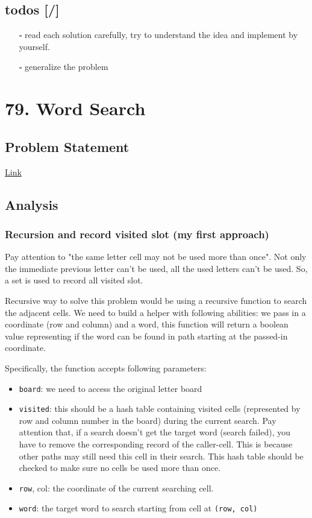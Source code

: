 \documentclass[12pt]{article}
\begin{document}
\subsection{todos [/]}
\label{sec:org1f2cc5f}
\begin{itemize}
\item[{$\square$}] read each solution carefully, try to understand the idea and implement by yourself.
\item[{$\square$}] generalize the problem
\end{itemize}

\section{79. Word Search}
\label{sec:org059f71b}
\subsection{Problem Statement}
\label{sec:org671f98a}
\href{https://leetcode.com/problems/word-search/}{Link}
\subsection{Analysis}
\label{sec:org80840ec}
\subsubsection{Recursion and record visited slot (my first approach)}
\label{sec:orgad44304}
Pay attention to "the same letter cell may not be used more than once". Not only the immediate previous letter can't be used, all the used letters can't be used. So, a set is used to record all visited slot.

Recursive way to solve this problem would be using a recursive function to search the adjacent cells. We need to build a helper with following abilities: we pass in a coordinate (row and column) and a word, this function will return a boolean value representing if the word can be found in path starting at the passed-in coordinate.

Specifically, the function accepts following parameters:
\begin{itemize}
\item \texttt{board}: we need to access the original letter board
\item \texttt{visited}: this should be a hash table containing visited cells (represented by row and column number in the board) during the current search. Pay attention that, if a search doesn't get the target word (search failed), you have to remove the corresponding record of the caller-cell. This is because other paths may still need this cell in their search. This hash table should be checked to make sure no cells be used more than once.
\item \texttt{row}, col: the coordinate of the current searching cell.
\item \texttt{word}: the target word to search starting from cell at \texttt{(row, col)}
\end{itemize}
\end{document}
